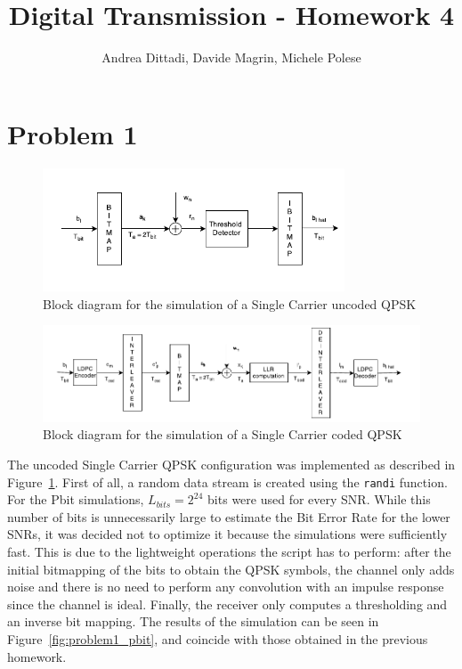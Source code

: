 \documentclass[10pt]{article}
\begin{document}
\title{Digital Transmission - Homework 4}
\author{Andrea Dittadi, Davide Magrin, Michele Polese}

\maketitle


\section*{Problem 1}


\begin{figure}[h!]
	\centering
	\includegraphics[width = 0.8\textwidth]{SC_uncoded}
	\caption{Block diagram for the simulation of a Single Carrier uncoded QPSK}
	\label{fig:problem1_scuncoded}
\end{figure}

\begin{figure}[h!]
	\centering
	\includegraphics[width = \textwidth]{SC_coded}
	\caption{Block diagram for the simulation of a Single Carrier coded QPSK}
	\label{fig:problem1_sccoded}
\end{figure}

The uncoded Single Carrier QPSK configuration was implemented as described in Figure~\ref{fig:problem1_scuncoded}. First of all, a random data stream is created using the \texttt{randi} function. For the Pbit simulations, $L_{bits} = 2^{24}$ bits were used for every SNR. While this number of bits is unnecessarily large to estimate the Bit Error Rate for the lower SNRs, it was decided not to optimize it because the simulations were sufficiently fast. This is due to the lightweight operations the script has to perform: after the initial bitmapping of the bits to obtain the QPSK symbols, the channel only adds noise and there is no need to perform any convolution with an impulse response since the channel is ideal. Finally, the receiver only computes a thresholding and an inverse bit mapping. The results of the simulation can be seen in Figure~\ref{fig:problem1_pbit}, and coincide with those obtained in the previous homework. %
\end{document}
